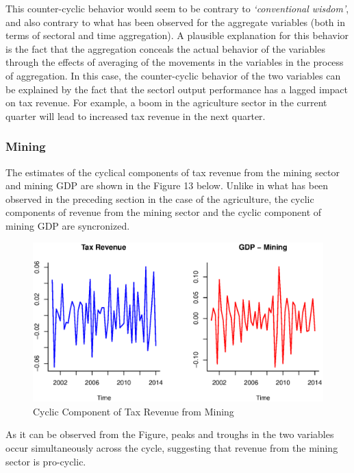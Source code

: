 \documentclass[12pt,a4paper,final]{article}
\begin{document}
This counter-cyclic behavior would seem to be contrary to \textit{`conventional wisdom'}, and also contrary to what has been observed for the aggregate variables (both in terms of sectoral and time aggregation).  A plausible explanation for this behavior is the fact that the aggregation conceals the actual behavior of the variables through the effects of averaging of the movements in the variables in the process of aggregation. In this case, the counter-cyclic behavior of the two variables can be explained by the fact that the sectorl output performance has a lagged impact on tax revenue. For example, a boom in the agriculture sector in the current quarter will lead to increased tax revenue in the next quarter.  

\subsubsection{Mining}

The estimates of the cyclical components of tax revenue from the mining sector and mining GDP are shown in the Figure 13 below. Unlike in what has been observed in the preceding section in the case of the agriculture, the cyclic components of revenue from the mining sector and the cyclic component of mining GDP are syncronized.

\begin{figure}[h]
\centering
\begin{small}
\caption{Cyclic Component of Tax Revenue from Mining}
\end{small}
\includegraphics[scale=0.601]{mining.eps} 
\end{figure}

As it can be observed from the Figure, peaks and troughs in the two variables occur simultaneously across the cycle, suggesting that revenue from the mining sector is pro-cyclic.
\end{document}
